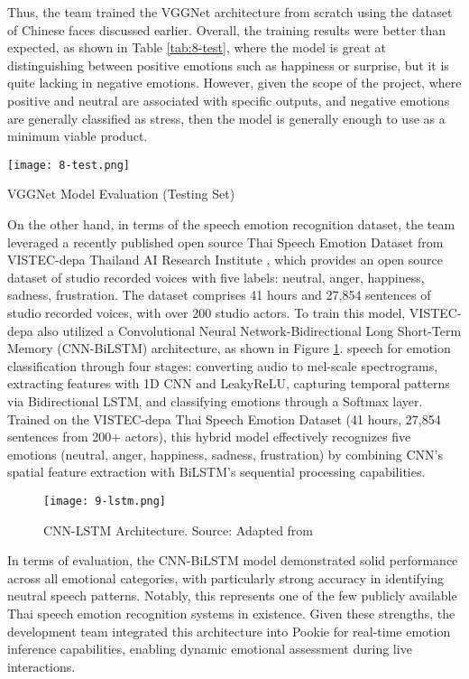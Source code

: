 Thus, the team trained the VGGNet architecture from scratch using the dataset of Chinese faces discussed earlier. Overall, the training results were better than expected, as shown in Table \ref{tab:8-test}, where the model is great at distinguishing between positive emotions such as happiness or surprise, but it is quite lacking in negative emotions. However, given the scope of the project, where positive and neutral are associated with specific outputs, and negative emotions are generally classified as stress, then the model is generally enough to use as a minimum viable product.

\begin{table} [!ht]
    \centering
    \texttt{[image: 8-test.png]}
    \captionsetup{justification=centering}
    \caption{VGGNet Model Evaluation (Testing Set)}
    \label{tab:8-test}
\end{table}

\newpage
On the other hand, in terms of the speech emotion recognition dataset, the team leveraged a recently published open source Thai Speech Emotion Dataset from VISTEC-depa Thailand AI Research Institute \cite{vistec_ai_ser}, which provides an open source dataset of studio recorded voices with five labels: neutral, anger, happiness, sadness, frustration. The dataset comprises 41 hours and 27,854 sentences of studio recorded voices, with over 200 studio actors. To train this model, VISTEC-depa also utilized a Convolutional Neural Network-Bidirectional Long Short-Term Memory (CNN-BiLSTM) architecture, as shown in Figure \ref{fig:9-lstm}. speech for emotion classification through four stages: converting audio to mel-scale spectrograms, extracting features with 1D CNN and LeakyReLU, capturing temporal patterns via Bidirectional LSTM, and classifying emotions through a Softmax layer. Trained on the VISTEC-depa Thai Speech Emotion Dataset (41 hours, 27,854 sentences from 200+ actors), this hybrid model effectively recognizes five emotions (neutral, anger, happiness, sadness, frustration) by combining CNN's spatial feature extraction with BiLSTM's sequential processing capabilities.

\begin{figure} [!ht]
    \centering
    \texttt{[image: 9-lstm.png]}
    \captionsetup{justification=centering}
    \caption{CNN-LSTM Architecture. Source: Adapted from \cite{vistec_ai_ser}}
    \label{fig:9-lstm}
\end{figure}

In terms of evaluation, the CNN-BiLSTM model demonstrated solid performance across all emotional categories, with particularly strong accuracy in identifying neutral speech patterns. Notably, this represents one of the few publicly available Thai speech emotion recognition systems in existence. Given these strengths, the development team integrated this architecture into Pookie for real-time emotion inference capabilities, enabling dynamic emotional assessment during live interactions.

